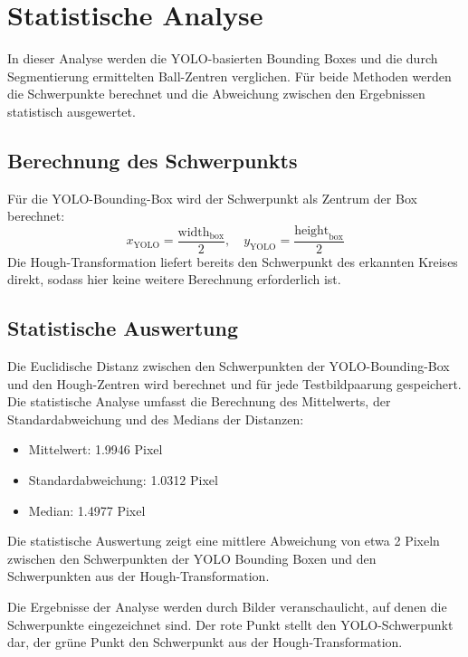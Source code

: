 \section{Statistische Analyse}

In dieser Analyse werden die YOLO-basierten Bounding Boxes und die durch Segmentierung ermittelten Ball-Zentren verglichen. Für beide Methoden werden die Schwerpunkte berechnet und die Abweichung zwischen den Ergebnissen statistisch ausgewertet.

\subsection{Berechnung des Schwerpunkts}
Für die YOLO-Bounding-Box wird der Schwerpunkt als Zentrum der Box berechnet:
\[
x_{\text{YOLO}} = \frac{\text{width}_{\text{box}}}{2}, \quad y_{\text{YOLO}} = \frac{\text{height}_{\text{box}}}{2}
\]
Die Hough-Transformation liefert bereits den Schwerpunkt des erkannten Kreises direkt, sodass hier keine weitere Berechnung erforderlich ist.

\subsection{Statistische Auswertung}
Die Euclidische Distanz zwischen den Schwerpunkten der YOLO-Bounding-Box und den Hough-Zentren wird berechnet und für jede Testbildpaarung gespeichert. Die statistische Analyse umfasst die Berechnung des Mittelwerts, der Standardabweichung und des Medians der Distanzen:

\begin{itemize}
    \item Mittelwert: 1.9946 Pixel
    \item Standardabweichung: 1.0312 Pixel
    \item Median: 1.4977 Pixel
\end{itemize}

Die statistische Auswertung zeigt eine mittlere Abweichung von etwa 2 Pixeln zwischen den Schwerpunkten der YOLO Bounding Boxen und den Schwerpunkten aus der Hough-Transformation.

Die Ergebnisse der Analyse werden durch Bilder veranschaulicht, auf denen die Schwerpunkte eingezeichnet sind. Der rote Punkt stellt den YOLO-Schwerpunkt dar, der grüne Punkt den Schwerpunkt aus der Hough-Transformation.

